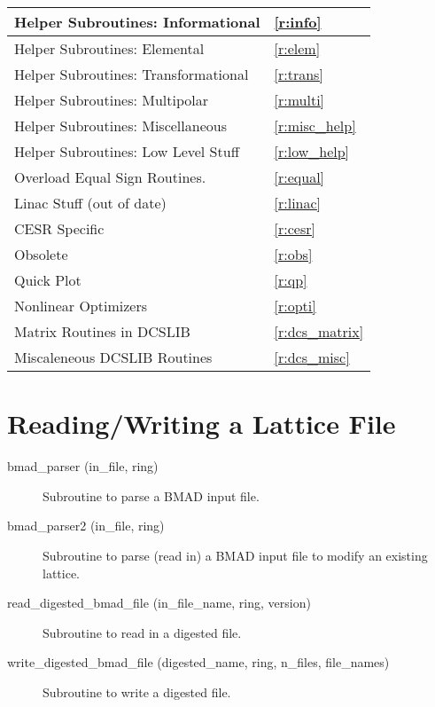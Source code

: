 \begin{center}
\begin{tabular}{|l|l|}
 	Helper Subroutines: Informational       & \ref{r:info}      \\ \hline
 	Helper Subroutines: Elemental           & \ref{r:elem}      \\ \hline
 	Helper Subroutines: Transformational    & \ref{r:trans}     \\ \hline
 	Helper Subroutines: Multipolar          & \ref{r:multi}     \\ \hline
 	Helper Subroutines: Miscellaneous       & \ref{r:misc_help} \\ \hline
 	Helper Subroutines: Low Level Stuff     & \ref{r:low_help}  \\ \hline
 	Overload Equal Sign Routines.           & \ref{r:equal}     \\ \hline
 	Linac Stuff (out of date)               & \ref{r:linac}     \\ \hline
 	CESR Specific                           & \ref{r:cesr}      \\ \hline
 	Obsolete                                & \ref{r:obs}       \\ \hline \hline
  Quick Plot                              & \ref{r:qp}        \\ \hline
  Nonlinear Optimizers                    & \ref{r:opti}      \\ \hline
  Matrix Routines in DCSLIB               & \ref{r:dcs_matrix} \\ \hline
  Miscaleneous DCSLIB Routines            & \ref{r:dcs_misc}  \\ \hline
\end{tabular}
\end{center}
\toffset

\section{Reading/Writing a Lattice File} 
\label{r:read}

\begin{description}

\item[bmad\_parser (in\_file, ring)] \Newline
Subroutine to parse a BMAD input file. 

\item[bmad\_parser2 (in\_file, ring)] \Newline
Subroutine to parse (read in) a BMAD input file to modify an existing lattice. 

\item[read\_digested\_bmad\_file (in\_file\_name, ring, version)] \Newline
Subroutine to read in a digested file. 

\item[write\_digested\_bmad\_file (digested\_name, ring, n\_files, file\_names)] \Newline
Subroutine to write a digested file. 

\end{description}


